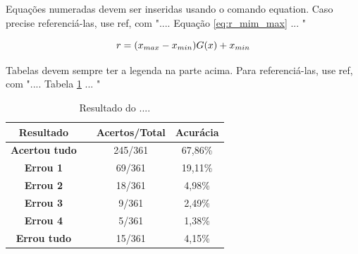 Equações numeradas devem ser inseridas usando o comando equation. Caso precise referenciá-las, use ref, com ".... Equação \ref{eq:r_mim_max} ... "

\begin{equation}
\centering
r = (x_{max} - x_{min})G(x) + x_{min} 
\label{eq:r_mim_max}
\end{equation}

Tabelas devem sempre ter a legenda na parte acima. Para referenciá-las, use ref, com ".... Tabela \ref{tab:resultados_1} ... "



\begin{table}[htb]
		\centering
		\caption{Resultado do ....}
		\label{tab:resultados_1}
		\begin{tabular}{cccc}
			\hline
    \textbf{Resultado }& & \textbf{Acertos/Total} & \textbf{Acurácia } \\\hline

	\textbf{Acertou tudo}&    & 245/361 & 67,86\% \\
	\textbf{Errou 1}     &    & 69/361  & 19,11\% \\
	\textbf{Errou 2}     &    & 18/361  & 4,98\%  \\
	\textbf{Errou 3}     &    & 9/361   & 2,49\%  \\
	\textbf{Errou 4}     &    & 5/361   & 1,38\%  \\
	\textbf{Errou tudo}  &    & 15/361  & 4,15\%  \\ \hline
	\end{tabular}
\end{table}